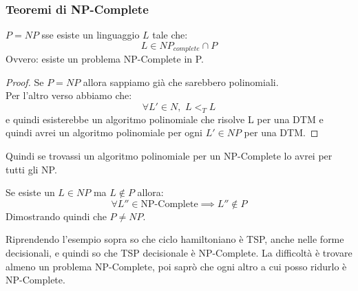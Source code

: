 \subsubsection{Teoremi di NP-Complete}
\begin{definizione}
  $P=NP$ sse esiste un linguaggio $L$ tale che:
  \[L\in NP_{complete}\cap P\]
  Ovvero: esiste un problema NP-Complete in P.
\end{definizione}
\begin{proof}
  Se $P=NP$ allora sappiamo già che sarebbero polinomiali.\\
  Per l'altro verso abbiamo che:
  \[\forall L'\in N, \,\,L<_T L\]
  e quindi esisterebbe un algoritmo polinomiale che risolve L per una DTM e
  quindi avrei un algoritmo polinomiale per ogni $L'\in NP$ per una DTM.
\end{proof}
Quindi se trovassi un algoritmo polinomiale per un NP-Complete lo avrei per
tutti gli NP.
\begin{definizione}
  Se esiste un $L\in NP$ ma $L\not\in P$ allora:
  \[\forall L''\in \mbox{NP-Complete}\implies L''\not\in P \]
Dimostrando quindi che $P\neq NP$.\\
\end{definizione}

Riprendendo l'esempio sopra so
che ciclo hamiltoniano è TSP, anche nelle forme decisionali, e quindi so che TSP
decisionale è NP-Complete. La difficoltà è trovare almeno un problema
NP-Complete, poi saprò che ogni altro a cui posso ridurlo è NP-Complete.\\
